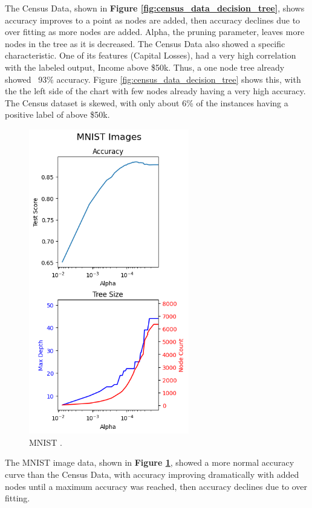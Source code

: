 \documentclass[letterpaper]{article} %
\begin{document}
The Census Data, shown in \textbf{Figure \ref{fig:census_data_decision_tree}},  shows accuracy improves to a point as nodes are added, then accuracy declines due to over fitting as more nodes are added.  Alpha, the pruning parameter, leaves more nodes in the tree as it is decreased.  The Census Data also showed a specific characteristic.  One of its features (Capital Losses), had a very high correlation with the labeled output, Income above \$50k.  Thus, a one node tree already showed ~93\% accuracy.  Figure \ref{fig:census_data_decision_tree} shows this, with the the left side of the chart with few nodes already having a very high accuracy.  The Census dataset is skewed, with only about 6\% of the instances having a positive label of above \$50k. 

\begin{figure}[h]
\centering
\includegraphics[width=2.75in]{figures/MNIST_Images_decision_tree.png}
\caption{MNIST . }
\label{fig:MNIST_Images_decision_tree}
\end{figure}

The MNIST image data, shown in \textbf{Figure \ref{fig:MNIST_Images_decision_tree}}, showed a more normal accuracy curve than the Census Data, with accuracy improving dramatically with added nodes until a maximum accuracy was reached, then accuracy declines due to over fitting.  
\end{document}
